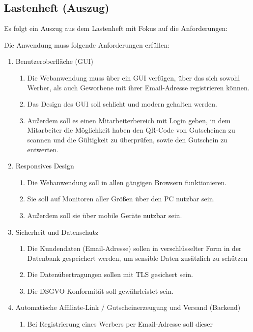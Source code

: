 \subsection{Lastenheft (Auszug)}
\label{app:Lastenheft}
Es folgt ein Auszug aus dem Lastenheft mit Fokus auf die Anforderungen:

Die Anwendung muss folgende Anforderungen erfüllen: 
\begin{enumerate}[itemsep=0em,partopsep=0em,parsep=0em,topsep=0em]
\item Benutzeroberfläche (\ac{GUI})
	\begin{enumerate}
	\item Die Webanwendung muss über ein \ac{GUI} verfügen, über das sich sowohl 
    Werber, als auch Geworbene mit ihrer Email-Adresse
    registrieren können.
	\item Das Design des \ac{GUI} soll schlicht und modern gehalten werden.
        \item Außerdem soll es einen Mitarbeiterbereich mit Login geben,
        in dem Mitarbeiter die Möglichkeit haben den \ac{QR}-Code von Gutscheinen
        zu scannen und die Gültigkeit zu überprüfen, sowie den Gutschein zu entwerten.
	\end{enumerate}
\item Responsives Design
	\begin{enumerate}
	\item Die Webanwendung soll in allen gängigen Browsern funktionieren.
        \item Sie soll auf Monitoren aller Größen über den PC nutzbar sein.
        \item Außerdem soll sie über mobile Geräte nutzbar sein.
	\end{enumerate}
\item Sicherheit und Datenschutz
	\begin{enumerate}
        \item Die Kundendaten (Email-Adresse) sollen in verschlüsselter Form
        in der Datenbank gespeichert werden, um sensible Daten zusätzlich zu 
        schützen
        \item Die Datenübertragungen sollen mit \ac{TLS} gesichert sein.
        \item Die \ac{DSGVO} Konformität soll gewährleistet sein.
	\end{enumerate}
\item Automatische Affiliate-Link / Gutscheinerzeugung und Versand (Backend)
        \begin{enumerate}
            \item Bei Registrierung eines Werbers per Email-Adresse soll dieser 

\end{enumerate}
\end{enumerate}
